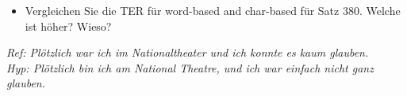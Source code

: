 \documentclass[12pt,fleqn]{article}
\begin{document}
\begin{enumerate}
\begin{enumerate}
\vspace{0.5cm} 
\begin{itemize} 
 \item Vergleichen Sie die TER für word-based and char-based für Satz 380. Welche ist höher? Wieso?
\end{itemize}
\vspace{0.5cm} 
\textit{Ref: Plötzlich war ich im Nationaltheater und ich konnte es kaum glauben. } \\ 
\textit{Hyp: Plötzlich bin ich am National Theatre, und ich war einfach nicht ganz glauben. } \\ 

\end{enumerate}

\end{enumerate}

\newpage



\end{document}
